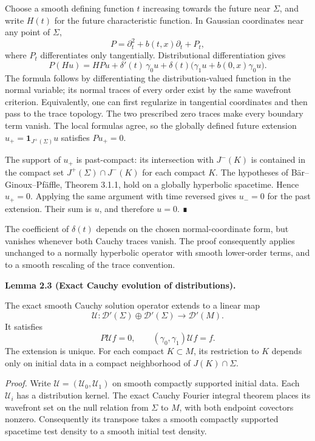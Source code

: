 \documentclass[
  english,
  11pt,
  reqno]{amsart}
\makeatletter
\newcommand{\pandocstatementheading}[1]{%
  \par\if@nobreak\else
    \addpenalty{\@beginparpenalty}%
    \addvspace{.5\baselineskip plus .2\baselineskip minus .2\baselineskip}%
  \fi
  {\normalfont\bfseries #1\par}%
  \nobreak\@afterindenttrue\@afterheading
}
\makeatother
\begin{document}
Choose a smooth defining function \(t\) increasing towards the future
near \(\Sigma\), and write \(H(t)\) for the future characteristic
function. In Gaussian coordinates near any point of \(\Sigma\), \[
P=\partial_t^2+b(t,x)\partial_t+P_t,
\] where \(P_t\) differentiates only tangentially. Distributional
differentiation gives \[
P(Hu)
=H Pu+\delta'(t)\,\gamma_0u
+\delta(t)\bigl(\gamma_1u+b(0,x)\gamma_0u\bigr).
\] The formula follows by differentiating the distribution-valued
function in the normal variable; its normal traces of every order exist
by the same wavefront criterion. Equivalently, one can first regularize
in tangential coordinates and then pass to the trace topology. The two
prescribed zero traces make every boundary term vanish. The local
formulas agree, so the globally defined future extension
\(u_+=\mathbf1_{J^+(\Sigma)}u\) satisfies \(Pu_+=0\).

The support of \(u_+\) is past-compact: its intersection with \(J^-(K)\)
is contained in the compact set \(J^+(\Sigma)\cap J^-(K)\) for each
compact \(K\). The hypotheses of Bär--Ginoux--Pfäffle, Theorem 3.1.1,
hold on a globally hyperbolic spacetime. Hence \(u_+=0\). Applying the
same argument with time reversed gives \(u_-=0\) for the past extension.
Their sum is \(u\), and therefore \(u=0\). ∎

The coefficient of \(\delta(t)\) depends on the chosen normal-coordinate
form, but vanishes whenever both Cauchy traces vanish. The proof
consequently applies unchanged to a normally hyperbolic operator with
smooth lower-order terms, and to a smooth rescaling of the trace
convention.

\pandocstatementheading{\protect{}\label{lem:distributional-cauchy-evolution}Lemma 2.3 (Exact Cauchy evolution of distributions).}

The exact smooth Cauchy solution operator extends to a linear map \[
\mathcal U:\mathcal D'(\Sigma)\oplus\mathcal D'(\Sigma)
\longrightarrow\mathcal D'(M).
\] It satisfies \[
P\mathcal U f=0,\qquad
(\gamma_0,\gamma_1)\mathcal U f=f.
\] The extension is unique. For each compact \(K\subset M\), its
restriction to \(K\) depends only on initial data in a compact
neighborhood of \(J(K)\cap\Sigma\).

\emph{Proof.} Write \(\mathcal U=(\mathcal U_0,\mathcal U_1)\) on smooth
compactly supported initial data. Each \(\mathcal U_i\) has a
distribution kernel. The exact Cauchy Fourier integral theorem places
its wavefront set on the null relation from \(\Sigma\) to \(M\), with
both endpoint covectors nonzero. Consequently its transpose takes a
smooth compactly supported spacetime test density to a smooth initial
test density.
\end{document}

